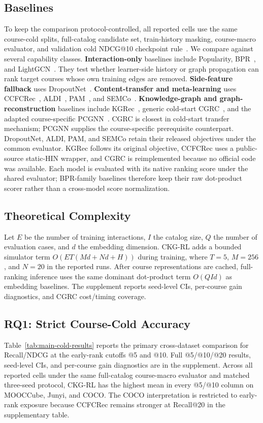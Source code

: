 \documentclass[letterpaper]{article}
\begin{document}
\subsection{Baselines}
To keep the comparison protocol-controlled, all reported cells use the same course-cold splits, full-catalog candidate set, train-history masking, course-macro evaluator, and validation cold NDCG@10 checkpoint rule~\cite{sun2020rigorous,hidasi2023flaws}. We compare against several capability classes. \textbf{Interaction-only} baselines include Popularity, BPR~\cite{rendle2009bpr}, and LightGCN~\cite{he2020lightgcn}. They test whether learner-side history or graph propagation can rank target courses whose own training edges are removed. \textbf{Side-feature fallback} uses DropoutNet~\cite{volkovs2017dropoutnet}. \textbf{Content-transfer and meta-learning} uses CCFCRec~\cite{zhou2023ccfcrec}, ALDI~\cite{huang2023aldi}, PAM~\cite{luo2025pam}, and SEMCo~\cite{meehan2026semco}. \textbf{Knowledge-graph and graph-reconstruction} baselines include KGRec~\cite{yang2023knowledge}, generic cold-start CGRC~\cite{kim2024cgrc}, and the adapted course-specific PCGNN~\cite{sun2024pcgnn}. CGRC is closest in cold-start transfer mechanism; PCGNN supplies the course-specific prerequisite counterpart. DropoutNet, ALDI, PAM, and SEMCo retain their released objectives under the common evaluator. KGRec follows its original objective, CCFCRec uses a public-source static-HIN wrapper, and CGRC is reimplemented because no official code was available. Each model is evaluated with its native ranking score under the shared evaluator; BPR-family baselines therefore keep their raw dot-product scorer rather than a cross-model score normalization.

\subsection{Theoretical Complexity}
Let \(E\) be the number of training interactions, \(I\) the catalog size, \(Q\) the number of evaluation cases, and \(d\) the embedding dimension. CKG-RL adds a bounded simulator term \(O(E T(Md+Nd+H))\) during training, where \(T=5\), \(M=256\), and \(N=20\) in the reported runs. After course representations are cached, full-ranking inference uses the same dominant dot-product term \(O(QId)\) as embedding baselines. The supplement reports seed-level CIs, per-course gain diagnostics, and CGRC cost/timing coverage.

\subsection{RQ1: Strict Course-Cold Accuracy}
Table~\ref{tab:main-cold-results} reports the primary cross-dataset comparison for Recall/NDCG at the early-rank cutoffs @5 and @10. Full @5/@10/@20 results, seed-level CIs, and per-course gain diagnostics are in the supplement. Across all reported cells under the same full-catalog course-macro evaluator and matched three-seed protocol, CKG-RL has the highest mean in every @5/@10 column on MOOCCube, Junyi, and COCO. The COCO interpretation is restricted to early-rank exposure because CCFCRec remains stronger at Recall@20 in the supplementary table.
\end{document}
